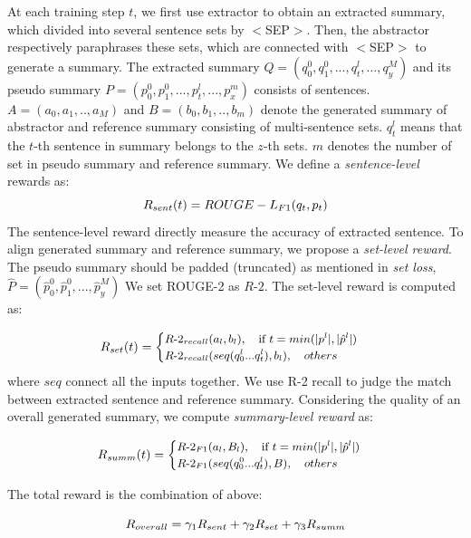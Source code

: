 At each training step $t$, 
we first use extractor to obtain an extracted summary, which divided into several 
sentence sets by $<$SEP$>$.
Then, the abstractor respectively
paraphrases these sets, which are connected with $<$SEP$>$ to generate a summary.
The extracted summary $Q = (q_0^0,q_1^0,...,q_t^l,...,q_{y}^{M})$ and its pseudo summary $P = (p_0^0,p_1^0,...,p_t^l,...,p_x^m)$ 
consists of sentences.
$A = (a_0,a_1,..,a_{M})$ and $B = (b_0,b_1,..,b_m)$ denote
the generated summary of abstractor and reference summary consisting of multi-sentence sets.
$q_t^l$ means that the $t$-th sentence in summary belongs to the $z$-th sets.
$m$ denotes the number of set in pseudo summary and reference summary.
We define a {\em sentence-level} rewards as:
\begin{equation}
\small
R_{sent}(t) = ROUGE-L_{F1}(q_t,p_t)
\end{equation}
The sentence-level reward directly measure the accuracy of extracted sentence.
To align generated summary and reference summary, we propose a {\em set-level reward}.
The pseudo summary should be padded (truncated) as mentioned in {\em set loss},
$\hat{P} = (\hat{p}_0^0,\hat{p}_1^0,...,\hat{p}_{y}^M)$
We set ROUGE-2 as $R$-$2$. 
The set-level reward is computed as:

\begin{equation}
\small
R_{set}(t) = 
	\begin{cases}
		   \mbox{$R$-$2_{recall}(a_l,b_l)$}, \quad \mbox{if $t=min(|p^l|,|\hat{p}^l|)$}\\
           \mbox{$R$-}2_{recall}(seq(q_0^l...q_t^l),b_l), \quad    \mbox{$others$}\\
   \end{cases}
\end{equation}
where $seq$ connect all the inputs together.
We use R-2 recall to judge the match between extracted sentence and reference summary.
Considering the quality of an overall generated summary,
we compute {\em summary-level reward} as:

\begin{equation}
\small
R_{summ}(t) = 
	\begin{cases}
		   \mbox{$R$-$2_{F1}(a_l,B_l)$}, \quad \mbox{if $t=min(|p^l|,|\hat{p}^l|)$}&\\
           \mbox{$R$-}2_{F1}(seq(q_0^0...q_t^l),B), \quad \mbox{$others$}&\\
   \end{cases}
\end{equation}

The total reward is the combination of above:

\begin{equation}
\label{func:reward}
\small
R_{overall} = \gamma_{1}R_{sent} + \gamma_{2}R_{set} + \gamma_{3}R_{summ}
\end{equation}



